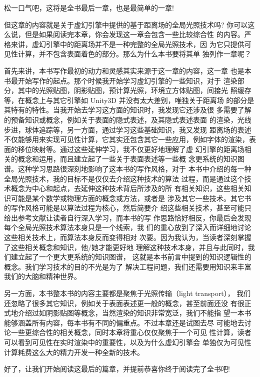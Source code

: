 松一口气吧，这将是全书最后一章，也是最简单的一章!

但这章的内容就是关于虚幻引擎中提供的基于距离场的全局光照技术吗? 你可以这么说，但是如果阅读完本章，你会发现这一章会包含一些比较综合性 的内容。严格来讲，虚幻引擎中的距离场并不是一种完整的全局光照技术，因 为它只提供可见性计算，并不包含表面着色的部分。那么为什么本书要将其单 独列作一章呢？

首先来讲，本书写作最初的动力和灵感其实来源于这一章的内容，这一章 也是本书最开始写作的起点。那个时候我开始学习虚幻引擎的一些知识，对于 渲染部分，其中的光照贴图，阴影贴图，预计算光照，环境立方体贴图，间接光 照缓存等，在概念上与其它引擎如 Unity3D 并没有太大差别，唯独关于距离场 的部分是其特有的特性。当我开始去学习这方面的知识时，我发现它还涉及很 多需要了解的预备知识或概念，例如关于表面的隐式表述，及其隐式表述表面 的渲染，光线步进，球体追踪等，另一方面，通过学习这些基础知识，我又发现 距离场的表述不仅能够用来实现可见性计算，它其实还包含其它一些应用，例如字体的渲染，表面的移位映射等。通过这些延伸学习，我不仅更好地理解了虚 幻引擎的距离场相关的概念和运用，而且建立起了一些关于表面表述等一些概 念更系统的知识图谱。这种学习思路很深刻地影响了这本书的写作风格，对于 本书中介绍的每一种全局光照技术，我的目标不是仅仅去介绍这种技术的算法 过程，而是通过这个技术概念为中心和起点，去延伸这种技术背后所涉及的所 有相关知识，这些相关知识可能是某个数学或物理方面的概念或方法，或者是 涉及其它一些技术。其它书的写作风格可能是以算法过程为核心，然后简要介 绍这些相关技术，甚至可能只给出参考文献让读者自行深入学习，而本书的写 作思路恰好相反，你最后会发现每个全局光照技术算法本身只是一个线索，我 们的重心放到了深入而详细地讨论这些相关技术上，而算法本身反而变得相对 次要。因为我认为，当读者深刻掌握了这些相关概念和知识，他/她才能更好地 理解这种技术本身，并且与此同时，我们建立起了一个更大更系统的知识图谱， 这就是本书前言中提到的知识逻辑性的概念。我们学习技术的目的不光是为了 解决工程问题，我们还需要用知识来丰富我们的大脑和精神世界。

另一方面，本书整本书的内容主要都是聚焦于光照传输（light transport）， 我们还忽略了很多其它知识，例如关于表面表述更一般的概念，甚至前面还没 有很正式地介绍过如阴影贴图等概念，当然渲染的知识非常宽泛，我们不能指 望一本书能够涵盖所有内容，每本书有不同的偏重点。不过本章还是试图去尽 可能地去讨论一些更综合性的相关概念，同时本章将重心仅仅聚焦于一个可见 性计算，读者可以看到可见性在实时渲染中的重要性，以及为什么虚幻引擎会 单独仅为可见性计算耗费这么大的精力开发一种全新的技术。

好了，让我们开始阅读这最后的篇章，并提前恭喜你终于阅读完了全书吧!



